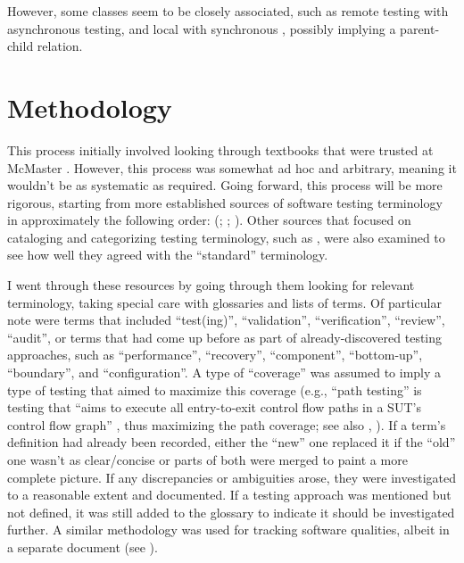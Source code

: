 However, some classes seem to be closely associated, such as remote testing
with asynchronous testing, and local with synchronous \citep{JardEtAl1999},
possibly implying a parent-child relation.

\section{Methodology}

This process initially involved looking through textbooks that were trusted at
McMaster \citep{Patton2006, PetersAndPedrycz2000, vanVliet2000}. However, this
process was somewhat ad hoc and arbitrary, meaning it wouldn't be as systematic
as required. Going forward, this process will be more rigorous, starting from
more established sources of software testing terminology in approximately the
following order:
(\citealp{IEEE2022, SWEBOK2024, SWEBOK2014, IEEE2017, IEEE2013, ISO_IEC2023b,
      IEEE2012, ISO_IEC2023a}; \citealpISTQB{}; \citealp{Firesmith2015, IEEE2021}).
Other sources that focused on cataloging and categorizing testing terminology,
such as \citet{KuļešovsEtAl2013}, were also examined to see how well they
agreed with the ``standard'' terminology.

I went through these resources by going through them looking for relevant
terminology, taking special care with glossaries and lists of terms. Of
particular note were terms that included ``test(ing)'', ``validation'',
``verification'', ``review'', ``audit'', or terms that had come up before
as part of already-discovered testing approaches, such as ``performance'',
``recovery'', ``component'', ``bottom-up'', ``boundary'', and ``configuration''.
A type of ``coverage'' was assumed to imply a type of testing that aimed to
maximize this coverage (e.g., ``path testing'' is testing that ``aims to
execute all entry-to-exit control flow paths in a SUT's control flow graph''
\citep[p.~5013]{SWEBOK2024}, thus maximizing the path coverage; see also
, \citet[Fig.~1]{SharmaEtAl2021}).
If a term's definition had already been recorded, either the ``new'' one
replaced it if the ``old'' one wasn't as clear/concise or parts of both were
merged to paint a more complete picture. If any discrepancies or ambiguities
arose, they were investigated to a reasonable extent and documented. If a
testing approach was mentioned but not defined, it was still added to the
glossary to indicate it should be investigated further. A similar methodology
was used for tracking software qualities, albeit in a separate document
(see ).

